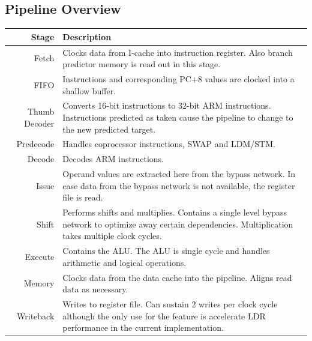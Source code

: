 \documentclass[10pt]{article}
\begin{document}
\subsection{Pipeline Overview}

\begin{tabularx} {\linewidth}{|r|X|}
\hline

Stage & 
Description \\ \hline 

Fetch & 
Clocks data from I-cache into instruction register. Also branch predictor memory 
is read out in this stage. \\ \hline 

FIFO &
Instructions and corresponding PC+8 values are clocked into a shallow buffer.
 \\ \hline

Thumb Decoder &
Converts 16-bit instructions to 32-bit ARM instructions. Instructions predicted 
as taken cause the pipeline to change to the new predicted target. \\ \hline

Predecode &
Handles coprocessor instructions, SWAP and LDM/STM. \\ \hline

Decode &
Decodes ARM instructions. \\ \hline

Issue &
Operand values are extracted here from the bypass network. In case data from 
the bypass network is not available, the register file is read. \\ \hline

Shift &
Performs shifts and multiplies. Contains a single level bypass network to 
optimize away certain dependencies. Multiplication takes multiple clock cycles. \\ \hline

Execute &
Contains the ALU. The ALU is single cycle and handles arithmetic and logical 
operations. \\ \hline

Memory &
Clocks data from the data cache into the pipeline. Aligns read data as 
necessary. \\ \hline

Writeback &
Writes to register file. Can sustain 2 writes per clock cycle although the 
only use for the feature is accelerate LDR performance in the current 
implementation. \\ \hline
\end{tabularx}
\\
\\
\end{document}
